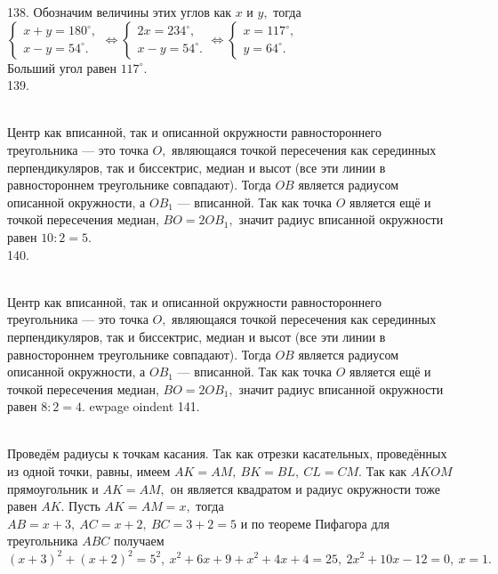 138. Обозначим величины этих углов как $x$ и $y,$ тогда $\begin{cases} x+y=180^\circ,\\x-y=54^\circ.\end{cases}\Leftrightarrow
\begin{cases} 2x=234^\circ,\\x-y=54^\circ.\end{cases}\Leftrightarrow\begin{cases} x=117^\circ,\\y=64^\circ.\end{cases}$\\
Больший угол равен $117^\circ.$\\
139. \begin{figure}[ht!]
\end{figure}\\
Центр как вписанной, так и описанной окружности равностороннего треугольника --- это точка $O,$ являющаяся точкой пересечения как серединных перпендикуляров, так и биссектрис, медиан и высот (все эти линии в равностороннем треугольнике совпадают). Тогда $OB$ является радиусом описанной окружности, а $OB_1$ --- вписанной. Так как точка $O$ является ещё и точкой пересечения медиан, $BO=2OB_1,$ значит радиус вписанной окружности равен $10:2=5.$\\
140. \begin{figure}[ht!]
\end{figure}\\
Центр как вписанной, так и описанной окружности равностороннего треугольника --- это точка $O,$ являющаяся точкой пересечения как серединных перпендикуляров, так и биссектрис, медиан и высот (все эти линии в равностороннем треугольнике совпадают). Тогда $OB$ является радиусом описанной окружности, а $OB_1$ --- вписанной. Так как точка $O$ является ещё и точкой пересечения медиан, $BO=2OB_1,$ значит радиус вписанной окружности равен $8:2=4.$
ewpage
oindent
141. \begin{figure}[ht!]
\end{figure}\\
Проведём радиусы к точкам касания. Так как отрезки касательных, проведённых из одной точки, равны, имеем $AK=AM,\ BK=BL,\ CL=CM.$ Так как $AKOM$ прямоугольник и $AK=AM,$ он является квадратом и радиус окружности тоже равен $AK.$ Пусть $AK=AM=x,$ тогда $AB=x+3,\ AC=x+2,\ BC=3+2=5$ и по теореме Пифагора для треугольника $ABC$ получаем $(x+3)^2+(x+2)^2=5^2,\ x^2+6x+9+x^2+4x+4=25,\ 2x^2+10x-12=0,\ x=1.$\\
